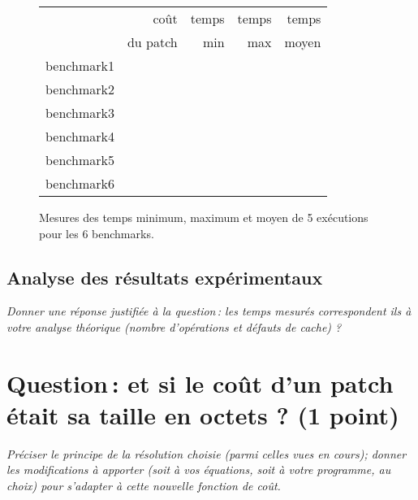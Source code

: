 \documentclass[a4paper, 10pt, french]{article}
\begin{document}
    \begin{figure}[h]
      \begin{center}
        \begin{tabular}{|l||r||r|r|r||}
          \hline
          \hline
            & coût         & temps     & temps   & temps \\
            & du patch     & min       & max     & moyen \\
          \hline
          \hline
            benchmark1 &      &     &     &     \\
          \hline
            benchmark2 &      &     &     &     \\
          \hline
            benchmark3 &      &     &     &     \\
          \hline
            benchmark4 &      &     &     &     \\
          \hline
            benchmark5 &      &     &     &     \\
          \hline
            benchmark6 &      &     &     &     \\
          \hline
          \hline
        \end{tabular}
        \caption{Mesures des temps minimum, maximum et moyen de 5 exécutions pour les 6 benchmarks.}
        \label{table-temps}
      \end{center}
    \end{figure}

\subsection{Analyse des résultats expérimentaux}
{\em Donner  une réponse justifiée  à la question\,:
              les  temps mesurés correspondent ils  à votre analyse théorique (nombre d’opérations et défauts de cache) ?
}

\section{Question\,: et  si le coût d'un patch était sa taille en octets ? (1 point)}
{\em Préciser le principe de la résolution choisie (parmi celles vues en cours); donner  les modifications à apporter (soit à vos  équations, soit à votre programme, au choix)
pour s'adapter à cette nouvelle fonction de coût.
}
\end{document}
